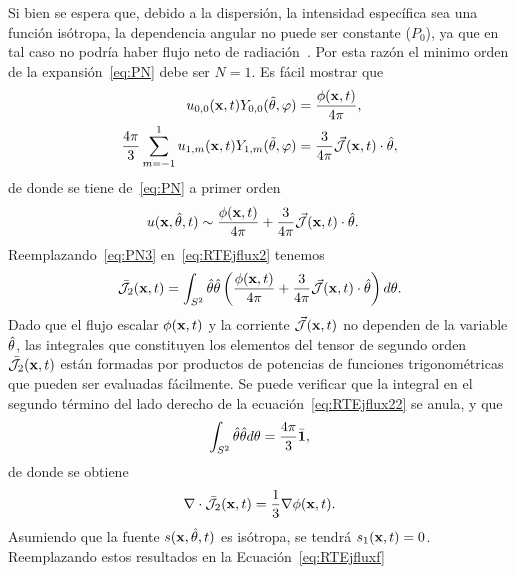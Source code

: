  Si bien se espera que, debido a la dispersión, la intensidad específica sea una función isótropa, la dependencia angular no puede ser constante ($P_0$), ya que en tal caso 
no podría haber flujo neto de radiación~\cite[cap. 9, p. 176]{Ishimaru1978}. Por esta razón el minimo 
orden de la expansión~\eqref{eq:PN} debe ser $N=1$. 
Es fácil mostrar que
\begin{equation}
\begin{split}
\begin{aligned}
u_{0,0}(\mathbf{x},t) Y_{0,0}(\tilde{\theta},\varphi) &=\frac{\phi(\mathbf{x},t)}{4\pi},\\
\frac{4\pi}{3} \sum_{m=-1}^1 u_{1,m}(\mathbf{x},t)Y_{1,m} (\tilde{\theta},\varphi) & = \frac{3}{4\pi} \vec{ \mathcal{J}}(\mathbf{x},t) \cdot \hat{\theta},
\end{aligned}
\end{split}
\label{eq:PN2}
\end{equation}
de donde se tiene de~\eqref{eq:PN} a primer orden
\begin{equation}
\begin{split}
\begin{aligned}
u(\mathbf{x},\hat{\theta},t)&\sim \frac{\phi(\mathbf{x},t)}{4\pi}+\frac{3}{4\pi} \vec{ \mathcal{J}}(\mathbf{x},t) \cdot \hat{\theta}.
\end{aligned}
\end{split}
\label{eq:PN3}
\end{equation}
Reemplazando~\eqref{eq:PN3} en~\eqref{eq:RTEjflux2} tenemos
\begin{equation}
\bar{\mathcal{J}}_2(\mathbf{x},t)=\int_{S^2} \hat{\theta} \hat{\theta} \left(  \frac{\phi(\mathbf{x},t)}{4\pi}+\frac{3}{4\pi} \vec{ \mathcal{J}}(\mathbf{x},t) \cdot \hat{\theta} \right) d\theta.
\label{eq:RTEjflux22}
\end{equation}
Dado que el flujo escalar $\phi(\mathbf{x},t)$ y la corriente $\vec{ \mathcal{J}}(\mathbf{x},t)$ no dependen de la variable $\hat{\theta}$, las integrales que 
constituyen los elementos del tensor de segundo orden $\bar{\mathcal{J}}_2(\mathbf{x},t)$ están formadas 
por productos de potencias de funciones trigonométricas que pueden ser evaluadas fácilmente. 
Se puede verificar que la integral en el segundo término del lado derecho de la ecuación~\eqref{eq:RTEjflux22} se anula, y que~\cite[cap. 17, p. 544]{Modest2013}
\begin{equation}
\int_{S^2} \hat{\theta} \hat{\theta} d\theta=\frac{4\pi}{3} \bar{\mathbf{1}},
\label{eq:RTEjflux23}
\end{equation}
de donde se obtiene 
\begin{equation}
\nabla \cdot \bar{\mathcal{J}}_2(\mathbf{x},t)=\frac{1}{3}\nabla \phi(\mathbf{x},t).
\label{eq:RTEjflux24}
\end{equation}
Asumiendo que la fuente $s(\mathbf{x},\hat{\theta},t)$ es isótropa, se tendrá $s_1(\mathbf{x},t)= 0$. Reemplazando estos resultados en la Ecuación~\eqref{eq:RTEjfluxf}
